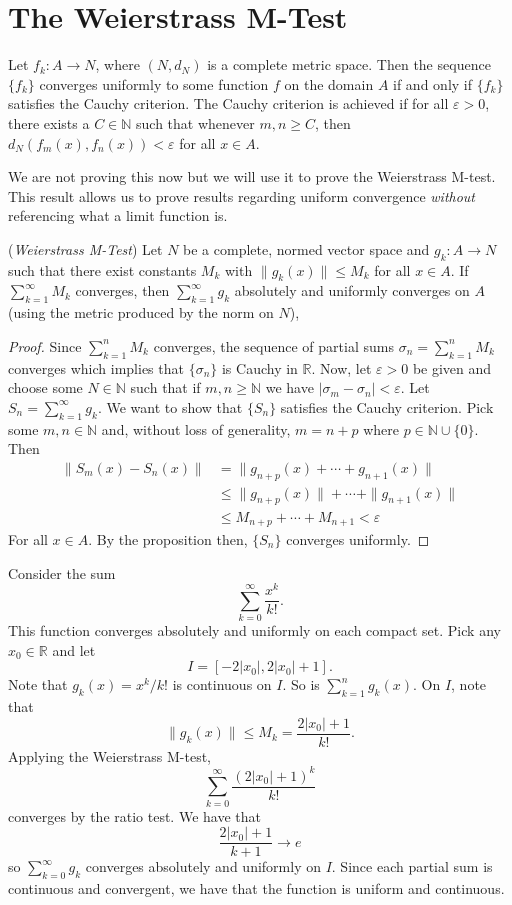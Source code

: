 \documentclass[11pt]{article}
\theoremstyle{definition}
\newcommand{\R}{\mathbb{R}}                      %
\newcommand{\N}{\mathbb{N}}
\begin{document}
\section{The Weierstrass M-Test}
\prop Let $f_k:A\to N$, where $(N,d_N)$ is a complete metric space. Then the sequence $\{f_k\}$ converges uniformly to some function $f$ on the domain $A$ if and only if $\{f_k\}$ satisfies the Cauchy criterion. The Cauchy criterion is achieved if for all $\varepsilon>0$, there exists a $C\in\N$ such that whenever $m,n\geq C$, then $d_N(f_m(x),f_n(x))<\varepsilon$ for all $x\in A$.

We are not proving this now but we will use it to prove the Weierstrass M-test. This result allows us to prove results regarding uniform convergence \textit{without} referencing what a limit function is.

\prop (\textit{Weierstrass M-Test}) Let $N$ be a complete, normed vector space and $g_k:A\to N$ such that there exist constants $M_k$ with $\|g_k(x)\|\leq M_k$ for all $x\in A$. If $\sum_{k=1}^\infty M_k$ converges, then $\sum_{k=1}^\infty g_k$ absolutely and uniformly converges on $A$ (using the metric produced by the norm on $N$),

\begin{proof}
    Since $\sum_{k=1}^n M_k$ converges, the sequence of partial sums $\sigma_n = \sum_{k=1}^n M_k$ converges which implies that $\{\sigma_n\}$ is Cauchy in $\R$. Now, let $\varepsilon>0$ be given and choose some $N\in \N$ such that if $m,n\geq \N$ we have $|\sigma_m-\sigma_n|<\varepsilon$. Let $S_n=\sum_{k=1}^\infty g_k$. We want to show that $\{S_n\}$ satisfies the Cauchy criterion. Pick some $m,n\in \N$ and, without loss of generality, $m=n+p$ where $p\in \N\cup\{0\}$. Then
    \begin{align*}
        \|S_m(x)-S_n(x)\|&=\|g_{n+p}(x)+\cdots+g_{n+1}(x)\|\\
        &\leq \|g_{n+p}(x)\|+\cdots+\|g_{n+1}(x)\|\\
        &\leq M_{n+p}+\cdots+M_{n+1}<\varepsilon
    \end{align*}
    For all $x\in A$. By the proposition then, $\{S_n\}$ converges uniformly.
\end{proof}
\ex Consider the sum
$$
\sum_{k=0}^\infty \frac{x^k}{k!}.
$$
This function converges absolutely and uniformly on each compact set. Pick any $x_0\in \R$ and let 
$$
I=\left[-2|x_0|,2|x_0|+1\right].
$$
Note that $g_k(x)=x^k/k!$ is continuous on $I$. So is $\sum_{k=1}^n g_k(x)$. On $I$, note that 
$$
\|g_k(x)\|\leq M_k = \frac{2|x_0|+1}{k!}.
$$
Applying the Weierstrass M-test,
$$
\sum_{k=0}^\infty \frac{(2|x_0|+1)^k}{k!}
$$
converges by the ratio test. We have that
$$
\frac{2|x_0|+1}{k+1}\to e
$$
so $\sum_{k=0}^\infty g_k$ converges absolutely and uniformly on $I$. Since each partial sum is continuous and convergent, we have that the function is uniform and continuous.
\end{document}
